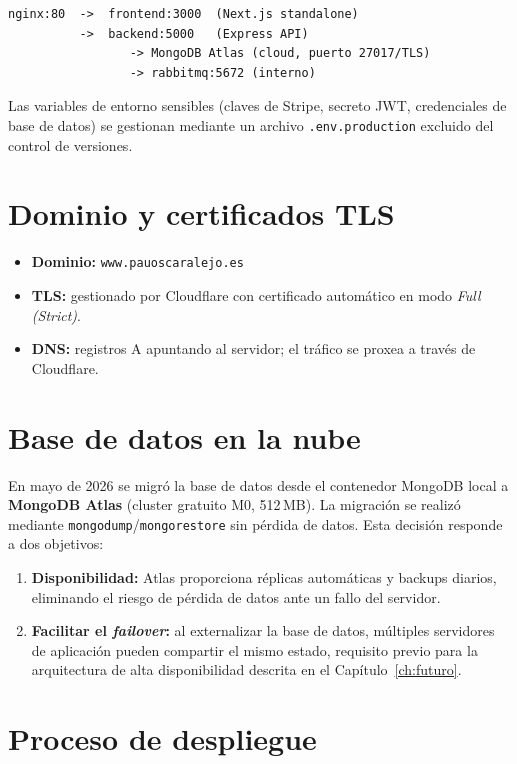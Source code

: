 \begin{lstlisting}[language={},title={Topología de servicios}]
nginx:80  ->  frontend:3000  (Next.js standalone)
          ->  backend:5000   (Express API)
                 -> MongoDB Atlas (cloud, puerto 27017/TLS)
                 -> rabbitmq:5672 (interno)
\end{lstlisting}

Las variables de entorno sensibles (claves de Stripe, secreto JWT, credenciales de base de datos) se gestionan mediante un archivo \texttt{.env.production} excluido del control de versiones.

\section{Dominio y certificados TLS}

\begin{itemize}
  \item \textbf{Dominio:} \texttt{www.pauoscaralejo.es}
  \item \textbf{TLS:} gestionado por Cloudflare con certificado automático en modo \emph{Full (Strict)}.
  \item \textbf{DNS:} registros A apuntando al servidor; el tráfico se proxea a través de Cloudflare.
\end{itemize}

\section{Base de datos en la nube}

En mayo de 2026 se migró la base de datos desde el contenedor MongoDB local a \textbf{MongoDB Atlas} (cluster gratuito M0, 512\,MB). La migración se realizó mediante \texttt{mongodump}/\texttt{mongorestore} sin pérdida de datos. Esta decisión responde a dos objetivos:

\begin{enumerate}
  \item \textbf{Disponibilidad:} Atlas proporciona réplicas automáticas y backups diarios, eliminando el riesgo de pérdida de datos ante un fallo del servidor.
  \item \textbf{Facilitar el \emph{failover}:} al externalizar la base de datos, múltiples servidores de aplicación pueden compartir el mismo estado, requisito previo para la arquitectura de alta disponibilidad descrita en el Capítulo~\ref{ch:futuro}.
\end{enumerate}

\section{Proceso de despliegue}

